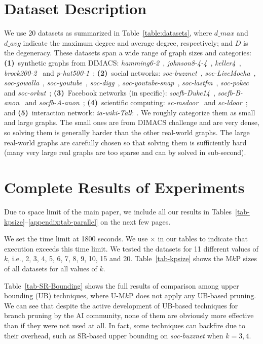 \documentclass[sigconf, nonacm]{acmart}
\begin{document}
\section{Dataset Description}\label{appendix:data}
We use 20 datasets as summarized in Table~\ref{table:datasets}, where $d\_max$ and $d\_avg$ indicate the maximum degree and average degree, respectively; and $D$ is the degeneracy. 
These datasets span a wide range of graph sizes and categories: {\bf (1)}~synthetic graphs from DIMACS: 
\textit{hamming6-2}~\cite{hamming6-2}, 
\textit{johnson8-4-4}~\cite{johnson8-4-4},
\textit{keller4}~\cite{keller4},
\textit{brock200-2}~\cite{brock200-2} and 
\textit{p-hat500-1}~\cite{p-hat500-1}; 
{\bf (2)}~social networks: 
\textit{soc-buzznet}~\cite{soc-buzznet},
\textit{soc-LiveMocha}~\cite{soc-LiveMocha},
\textit{soc-gowalla}~\cite{soc-gowalla},
\textit{soc-youtube}~\cite{soc-youtube},
\textit{soc-digg}~\cite{soc-digg},
\textit{soc-youtube-snap}~\cite{soc-youtube-snap},
\textit{soc-lastfm}~\cite{soc-lastfm},
\textit{soc-pokec}~\cite{soc-pokec} and 
\textit{soc-orkut}~\cite{soc-orkut};
{\bf (3)}~Facebook networks (in specific): 
\textit{socfb-Duke14}~\cite{socfb-Duke14},
\textit{socfb-B-anon}~\cite{socfb-B-anon} and 
\textit{socfb-A-anon}~\cite{socfb-A-anon};
{\bf (4)}~scientific computing: 
\textit{sc-msdoor}~\cite{sc-msdoor} and 
\textit{sc-ldoor}~\cite{sc-ldoor}; 
and {\bf (5)}~interaction network: \textit{ia-wiki-Talk}~\cite{ia-wiki-Talk}. 
We roughly categorize them as small and large graphs. The small ones are from DIMACS challenge and are very dense, so solving them is generally harder than the other real-world graphs. The large real-world graphs are carefully chosen so that solving them is sufficiently hard (many very large real graphs are too sparse and can by solved in sub-second). 

\section{Complete Results of Experiments}
Due to space limit of the main paper, we include all our results in Tables~\ref{tab-kpsize}--\ref{appendix:tab-parallel} on the next few pages.

We set the time limit at 1800 seconds. We use $\times$ in our tables to indicate that execution exceeds this time limit. We tested the datasets for 11 different values of $k$, i.e., 2, 3, 4, 5, 6, 7, 8, 9, 10, 15 and 20. 
Table~\ref{tab-kpsize} shows the M$k$P sizes of all datasets for all values of $k$.

Table~\ref{tab-SR-Bounding} shows the full results of comparison among upper bounding (UB) techniques, where U-M$k$P does not apply any UB-based pruning. We can see that despite the active development of UB-based techniques for branch pruning by the AI community, none of them are obviously more effective than if they were not used at all. In fact, some techniques can backfire due to their overhead, such as SR-based upper bounding on {\em soc-buzznet} when $k=3,4$.
\end{document}
